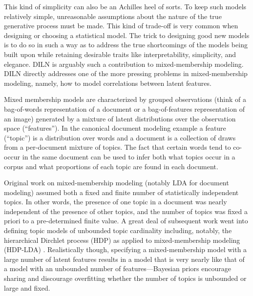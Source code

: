 \documentclass[twoside]{article}
\begin{document}
This kind of simplicity can also be an Achilles heel of sorts.  To keep such models relatively simple, unreasonable assumptions about the nature of the true generative process must be made.  This kind of trade-off is very common when designing or choosing a statistical model.  The trick to designing good new models  is to do so in such a way as to address the true shortcomings of the models being built upon while retaining desirable traits like interpretability, simplicity, and elegance. DILN is arguably such a contribution to mixed-membership modeling.  DILN directly addresses one of the more pressing problems in mixed-membership modeling, namely, how to model correlations between latent features. %


Mixed membership models are characterized by grouped observations (think of a bag-of-words representation of a document or a bag-of-features representation of an image) generated by a mixture of latent distributions over the observation space (``features'').  In the canonical document modeling example a feature (``topic'') is a distribution over words and a document is a collection of draws from a per-document mixture of topics.  The fact that certain words tend to co-occur in the same document can be used to infer both what topics occur in a corpus and what proportions of each topic are found in each document.  

Original work on mixed-membership modeling  (notably LDA for document modeling) assumed both a fixed and finite number of statistically independent topics.   In other words, the presence of one topic in a document was nearly independent of the presence of other topics, and the number of topics was fixed a priori to a pre-determined finite value.  A great deal of subsequent work went into defining topic models of unbounded topic cardinality including, notably, the hierarchical Dirchlet process (HDP) as applied to mixed-membership modeling (HDP-LDA) \citep{Teh2006b}.   Realistically though, specifying a mixed-membership model with a large number of latent features results in a model that is very nearly like that of a model with an unbounded number of features---Bayesian priors encourage sharing and discourage overfitting whether the number of topics is unbounded or large and fixed. 
\end{document}
